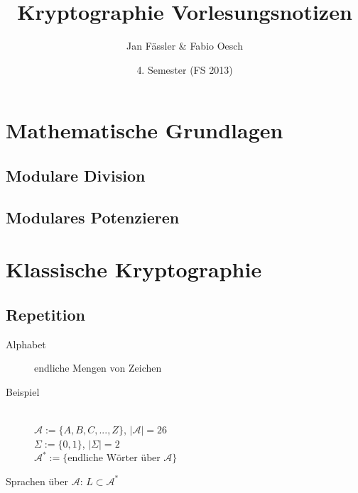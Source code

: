 \documentclass[10pt]{article}
\title{
	\vspace{5cm}
	Kryptographie Vorlesungsnotizen
}
\author{Jan Fässler \& Fabio Oesch}
\date{4. Semester (FS 2013)}
\newcommand{\Pota}{\mathcal{A}}
\newcommand{\T}[1]{\text{#1}} %
\begin{document}
\maketitle
\thispagestyle{fancy}

\newpage

\tableofcontents	  	


\newpage
\setcounter{page}{1}

\section{Mathematische Grundlagen}
\subsection{Modulare Division}

\subsection{Modulares Potenzieren}

\section{Klassische Kryptographie}
\setcounter{subsection}{-1}
\subsection{Repetition}
\begin{description}
	\item[Alphabet] endliche Mengen von Zeichen
	\item[Beispiel] \hfill \\
		$\Pota := \{A,B,C, ..., Z\}$, $|\Pota|=26$ \\
		$\Sigma := \{0,1\}$, $|\Sigma|=2$\\
		$\Pota ^*:=\{\T{endliche Wörter über }\Pota\}$
\end{description}
Sprachen über $\Pota$: $L\subset\Pota ^*$
\end{document}

